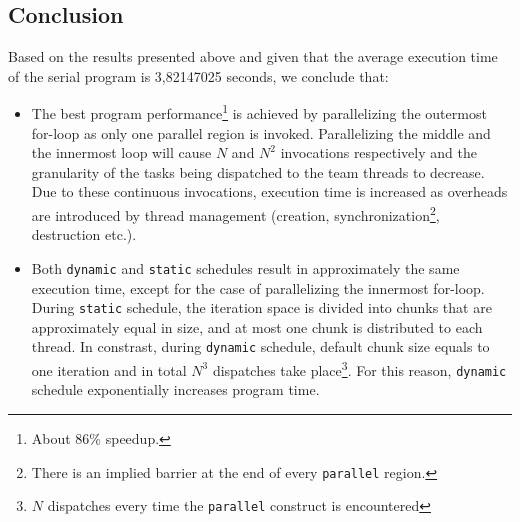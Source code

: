 \documentclass{article}
\def\code#1{\texttt{#1}}
\begin{document}
\subsection{Conclusion}
Based on the results presented above and given that the average execution time of the serial
program is 3,82147025 seconds, we conclude that:

\begin{itemize}
 \item The best program performance\footnote{About 86\% speedup.} is achieved by
       parallelizing the outermost for-loop as only one parallel region is invoked.
       Parallelizing the middle and the innermost loop will cause $N$ and $N^2$
       invocations respectively and the granularity of the tasks being dispatched to
       the team threads to decrease. Due to these continuous invocations, execution
       time is increased as overheads are introduced by thread management (creation, 
       synchronization\footnote{There is an implied barrier at the end of every
       \code{parallel} region.}, destruction etc.).
 \item Both \code{dynamic} and \code{static} schedules result in approximately the
       same execution time, except for the case of parallelizing the innermost 
       for-loop. During \code{static} schedule, the iteration space is divided
       into chunks that are approximately equal in size, and at most one chunk
       is distributed to each thread. In constrast, during \code{dynamic} schedule,
       default chunk size equals to one iteration and in total $N^3$ dispatches
       take place\footnote{$N$ dispatches every time the \code{parallel} construct
       is encountered}. For this reason, \code{dynamic} schedule exponentially
       increases program time.
\end{itemize}
\end{document}
